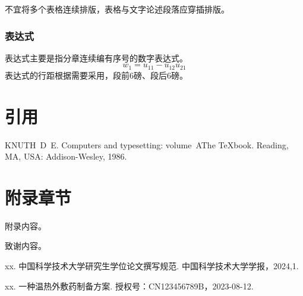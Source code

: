 不宜将多个表格连续排版，表格与文字论述段落应穿插排版。

\clearpage

\subsection{表达式}

表达式主要是指分章连续编有序号的数字表达式。
\begin{equation}
  w_1 = u_{11} - u_{12} u_{21}
  \label{eq:example}
\end{equation}
表达式的行距根据需要采用，段前6磅、段后6磅。

\chapter{引用}
\cite{knuth86a}

\begin{thebibliography}{1}
KNUTH~D~E.
\newblock Computers and typesetting: volume~A\quad The
  {\TeX}book\allowbreak[M].
\newblock Reading, MA, USA: Addison-Wesley, 1986.
\end{thebibliography}

\appendix
\chapter{附录章节}
附录内容。

\backmatter
\begin{acknowledgements}
  致谢内容。
\end{acknowledgements}

\begin{achievements}

\begin{theachievements}[已发表论文]
  \item xx. 中国科学技术大学研究生学位论文撰写规范. 中国科学技术大学学报，2024,1.
\end{theachievements}

\begin{theachievements}[发明专利]
  \item xx. 一种温热外敷药制备方案. 授权号：CN123456789B，2023-08-12.
\end{theachievements}

\end{achievements}
